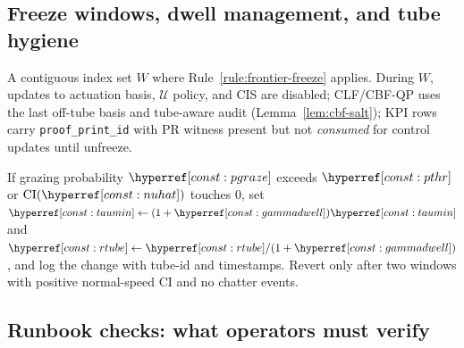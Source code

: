 \subsection{Freeze windows, dwell management, and tube hygiene}\label{subsec:freeze-hygiene}
\emph{}

\begin{definition}\label{def:freeze-window}
A contiguous index set $W$ where Rule~\ref{rule:frontier-freeze} applies. During $W$, updates to actuation basis, $\mathcal U$ policy, and CIS are disabled; CLF/CBF-QP uses the last off-tube basis and tube-aware audit (Lemma~\ref{lem:cbf-salt}); KPI rows carry \texttt{proof\_print\_id} with PR witness present but not \emph{consumed} for control updates until unfreeze.
\end{definition}

\begin{proposition}\label{prop:tube-retune}
If grazing probability $\constref{pgraze}$ exceeds $\constref{pthr}$ or $\mathrm{CI}(\constref{nuhat})$ touches $0$, set
$\constref{taumin}\leftarrow (1+\constref{gammadwell})\constref{taumin}$ and
$\constref{rtube}\leftarrow \constref{rtube}/(1+\constref{gammadwell})$, and log the change with tube-id and timestamps. Revert only after two windows with positive normal-speed CI and no chatter events.
\end{proposition}

\subsection{Runbook checks: what operators must verify}\label{subsec:runbook-checks}
\emph{}

